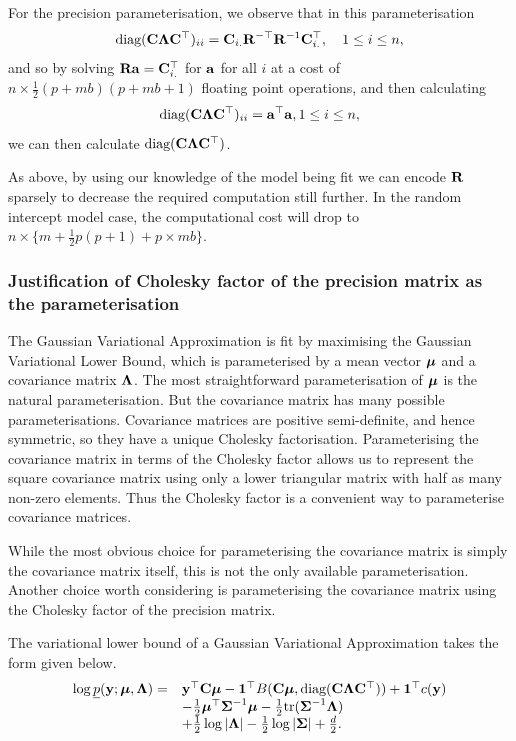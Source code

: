 	
For the precision parameterisation, we observe that in this parameterisation
\begin{equation*}
	\text{diag}({\bf C} {\boldsymbol \Lambda} {\bf C}^\top)_{ii} = {\bf C}_{i .} {\bf R}^{-\top} {\bf R}^{-1} {\bf C}_{i .}^\top,\quad 1 \leq i \leq n,
\end{equation*}
\noindent and so by solving ${\bf R} {\bf a} = {\bf C}_{i .}^\top$ for ${\bf a}$ for all $i$ at a cost of $n \times
\frac{1}{2} (p + m b) (p + m b + 1)$ floating point operations, and then calculating
\begin{equation*}
	\text{diag}({\bf C} {\boldsymbol \Lambda} {\bf C}^\top)_{ii} = {\bf a}^\top {\bf a}, 1 \leq i \leq n,
\end{equation*}
\noindent we can then calculate $\text{diag}({\bf C} {\boldsymbol \Lambda} {\bf C}^\top)$.
	
As above, by using our knowledge of the model being fit we can encode ${\bf R}$ sparsely to decrease the required
computation still further. In the random intercept model case, the computational cost will drop to $n \times
\{m + \frac{1}{2} p (p + 1) + p \times m b\}$.
			
\subsubsection{Justification of Cholesky factor of the precision matrix as the
parameterisation} The Gaussian Variational Approximation is fit by maximising
the Gaussian Variational Lower Bound, which is parameterised by a mean vector
${\boldsymbol \mu}$ and a covariance matrix ${\boldsymbol \Lambda}$. The most straightforward
parameterisation of ${\boldsymbol \mu}$ is the natural parameterisation. But the covariance
matrix has many possible parameterisations. Covariance matrices are positive
semi-definite, and hence symmetric, so they have a unique Cholesky
factorisation. Parameterising the covariance matrix in terms of the Cholesky
factor allows us to represent the square covariance matrix using only a lower
triangular matrix with half as many non-zero elements. Thus the Cholesky factor
is a convenient way to parameterise covariance matrices.

While the most obvious choice for parameterising the covariance matrix is
simply the covariance matrix itself, this is not the only available
parameterisation. Another choice worth considering is parameterising the
covariance matrix using the Cholesky factor of the precision matrix.

The variational lower bound of a Gaussian Variational Approximation takes the
form given below.
\begin{equation}
\label{eq:gva_lower_bound_precision_param2}
\begin{array}{ll}
\log \underline{p}({\bf y}; {\boldsymbol \mu}, {\boldsymbol \Lambda}) =& {\bf y}^\top {\bf C} {\boldsymbol\mu} - {\bf 1}^\top B({\bf C} {\boldsymbol \mu}, \text{diag}({\bf C} {\boldsymbol \Lambda} {\bf C}^\top)) + {\bf 1}^\top c({\bf y}) \\
&- \tfrac{1}{2} {\boldsymbol \mu}^\top {\boldsymbol\Sigma}^{-1} {\boldsymbol \mu} - \tfrac{1}{2} \text{tr}({\boldsymbol \Sigma}^{-1} {\boldsymbol \Lambda}) \\
&+ \tfrac{1}{2} \log |{\boldsymbol \Lambda}| - \tfrac{1}{2} \log |{\boldsymbol \Sigma}| + \tfrac{d}{2}.
\end{array}
\end{equation}

